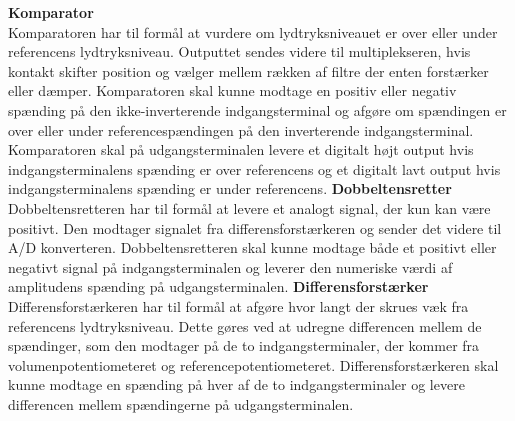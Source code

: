 \blankline
%
\textbf{Komparator}\\
Komparatoren har til formål at vurdere om lydtryksniveauet er over eller under referencens lydtryksniveau. Outputtet sendes videre til multiplekseren, hvis kontakt skifter position og vælger mellem rækken af filtre der enten forstærker eller dæmper. Komparatoren skal kunne modtage en positiv eller negativ spænding på den ikke-inverterende indgangsterminal og afgøre om spændingen er over eller under referencespændingen på den inverterende indgangsterminal. Komparatoren skal på udgangsterminalen levere et digitalt højt output hvis indgangsterminalens spænding er over referencens og et digitalt lavt output hvis indgangsterminalens spænding er under referencens.   
\blankline
%
\textbf{Dobbeltensretter}\\
Dobbeltensretteren har til formål at levere et analogt signal, der kun kan være positivt. Den modtager signalet fra differensforstærkeren og sender det videre til A/D konverteren. Dobbeltensretteren skal kunne modtage både et positivt eller negativt signal på indgangsterminalen og leverer den numeriske værdi af amplitudens spænding på udgangsterminalen. 
\blankline 	
%
\textbf{Differensforstærker}\\
Differensforstærkeren har til formål at afgøre hvor langt der skrues væk fra referencens lydtryksniveau. Dette gøres ved at udregne differencen mellem de spændinger, som den modtager på de to indgangsterminaler, der kommer fra volumenpotentiometeret og referencepotentiometeret. Differensforstærkeren skal kunne modtage en spænding på hver af de to indgangsterminaler og levere differencen mellem spændingerne på udgangsterminalen.   
\blankline	
%
